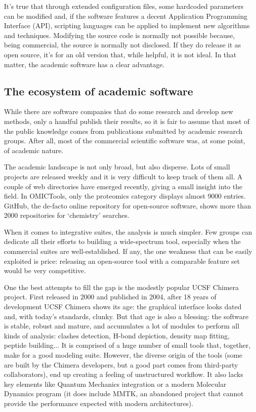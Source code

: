It’s true that through extended configuration files, some hardcoded parameters can be modified and, if the software features a decent Application Programming Interface (API), scripting languages can be applied to implement new algorithms and techniques. Modifying the source code is normally not possible because, being commercial, the source is normally not disclosed. If they do release it as open source, it’s for an old version that, while helpful, it is not ideal.\cite{delano2002pymol} In that matter, the academic software has a clear advantage.

\subsection{The ecosystem of academic software}
While there are software companies that do some research and develop new methods, only a handful publish their results, so it is fair to assume that most of the public knowledge comes from publications submitted by academic research groups. After all, most of the commercial scientific software was, at some point, of academic nature.\cite{gaussian,schrodingerpymol}

The academic landscape is not only broad, but also disperse. Lots of small projects are released weekly and it is very difficult to keep track of them all. A couple of web directories have emerged recently,\cite{omictools,pirhadi2016open} giving a small insight into the field. In OMICTools, only the proteomics category displays almost 9000 entries. GitHub,\cite{github} the de-facto online repository for open-source software, shows more than 2000 repositories for ‘chemistry’ searches.

When it comes to integrative suites, the analysis is much simpler. Few groups can dedicate all their efforts to building a wide-spectrum tool, especially when the commercial suites are well-established. If any, the one weakness that can be easily exploited is price: releasing an open-source tool with a comparable feature set would be very competitive.

One the best attempts to fill the gap is the modestly popular UCSF Chimera project. First released in 2000\cite{firstchimera} and published in 2004,\cite{chimera} after 18 years of development UCSF Chimera shows its age: the graphical interface looks dated and, with today’s standards, clunky. But that age is also a blessing: the software is stable, robust and mature, and accumulates a lot of modules to perform all kinds of analysis: clashes detection, H-bond depiction, density map fitting, peptide building$ \ldots $  It is comprised of a huge number of small tools that, together, make for a good modeling suite. However, the diverse origin of the tools (some are built by the Chimera developers, but a good part comes from third-party collaborators), end up creating a feeling of unstructured workflow. It also lacks key elements like Quantum Mechanics integration or a modern Molecular Dynamics program (it does include MMTK, an abandoned project that cannot provide the performance expected with modern architectures).

